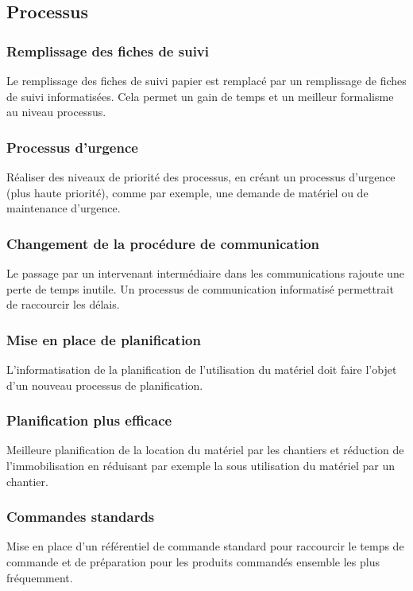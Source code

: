 \subsection{Processus}
 
\subsubsection{Remplissage des fiches de suivi}

Le remplissage des fiches de suivi papier est remplacé par un remplissage de 
fiches de suivi informatisées. 
Cela permet un gain de temps et un meilleur formalisme au niveau processus.

\subsubsection{Processus d’urgence}

Réaliser des niveaux de priorité des processus, en créant un processus d’urgence
 (plus haute priorité), comme par exemple, une demande de matériel 
ou de maintenance d’urgence.

\subsubsection{Changement de la procédure de communication}

Le passage par un intervenant intermédiaire dans les communications rajoute une 
perte de temps inutile. 
Un processus de communication informatisé permettrait de raccourcir les délais.

\subsubsection{Mise en place de planification}

L’informatisation de la planification de l’utilisation du matériel doit faire 
l’objet d’un nouveau processus de planification. 

\subsubsection{Planification plus efficace}

Meilleure planification de la location du matériel par les chantiers et 
réduction de l’immobilisation en réduisant par exemple la sous utilisation
du matériel par un chantier.

\subsubsection{Commandes standards}

Mise en place d'un référentiel de commande standard pour raccourcir le temps de
commande et de préparation pour les produits commandés ensemble les plus
fréquemment.
